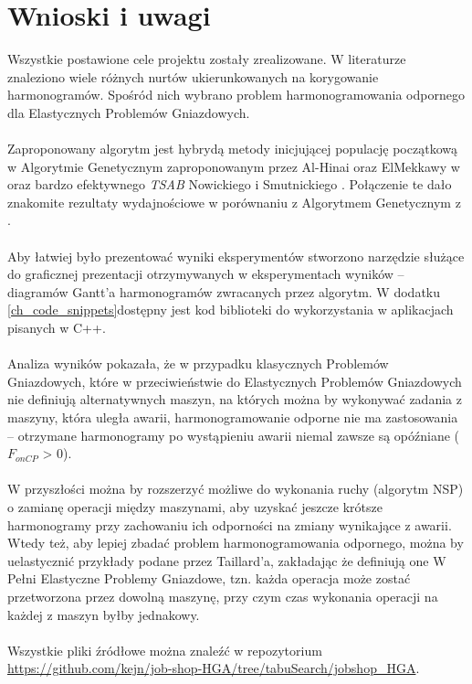 \documentclass[archivemode]{mgr}
\begin{document}
\chapter*{Wnioski i uwagi}
Wszystkie postawione cele projektu zostały zrealizowane. W literaturze znaleziono wiele różnych nurtów ukierunkowanych na korygowanie harmonogramów. Spośród nich wybrano problem harmonogramowania odpornego dla Elastycznych Problemów Gniazdowych.\\\\
Zaproponowany algorytm jest hybrydą metody inicjującej populację początkową w Algorytmie Genetycznym zaproponowanym przez Al-Hinai oraz ElMekkawy w \cite{AEHGAFJS_ElMekkawy11} oraz bardzo efektywnego \emph{TSAB} Nowickiego i Smutnickiego \cite{Smutnicki96}. Połączenie te dało znakomite rezultaty wydajnościowe w porównaniu z Algorytmem Genetycznym z \cite{AEHGAFJS_ElMekkawy11}.\\\\
Aby łatwiej było prezentować wyniki eksperymentów stworzono narzędzie służące do graficznej prezentacji otrzymywanych w eksperymentach wyników -- diagramów Gantt'a harmonogramów zwracanych przez algorytm. W dodatku \ref{ch_code_snippets}dostępny jest kod biblioteki do wykorzystania w aplikacjach pisanych w C++.\\\\
Analiza wyników pokazała, że w przypadku klasycznych Problemów Gniazdowych, które w przeciwieństwie do Elastycznych Problemów Gniazdowych nie definiują alternatywnych maszyn, na których można by wykonywać zadania z maszyny, która uległa awarii, harmonogramowanie odporne nie ma zastosowania -- otrzymane harmonogramy po wystąpieniu awarii niemal zawsze są opóźniane ($F_{onCP}$ > 0).\\\\
W przyszłości można by rozszerzyć możliwe do wykonania ruchy (algorytm NSP) o zamianę operacji między maszynami, aby uzyskać jeszcze krótsze harmonogramy przy zachowaniu ich odporności na zmiany wynikające z awarii. Wtedy też, aby lepiej zbadać problem harmonogramowania odpornego, można by uelastycznić przykłady podane przez Taillard'a, zakładając że definiują one W Pełni Elastyczne Problemy Gniazdowe, tzn. każda operacja może zostać przetworzona przez dowolną maszynę, przy czym czas wykonania operacji na każdej z maszyn byłby jednakowy.\\\\
Wszystkie pliki źródłowe można znaleźć w repozytorium \url{https://github.com/kejn/job-shop-HGA/tree/tabuSearch/jobshop_HGA}.
\end{document}
